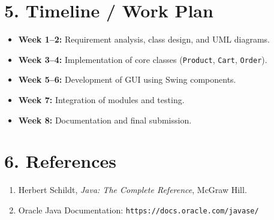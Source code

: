 \documentclass[12pt,a4paper]{article}
\begin{document}
\section*{5. Timeline / Work Plan}
\begin{itemize}[nosep]
    \item \textbf{Week 1--2:} Requirement analysis, class design, and UML diagrams.
    \item \textbf{Week 3--4:} Implementation of core classes (\texttt{Product}, \texttt{Cart}, \texttt{Order}).
    \item \textbf{Week 5--6:} Development of GUI using Swing components.
    \item \textbf{Week 7:} Integration of modules and testing.
    \item \textbf{Week 8:} Documentation and final submission.
\end{itemize}

\section*{6. References}
\begin{enumerate}[nosep,left=0pt]
    \item Herbert Schildt, \textit{Java: The Complete Reference}, McGraw Hill.
    \item Oracle Java Documentation: \texttt{https://docs.oracle.com/javase/}
\end{enumerate}
\end{document}
